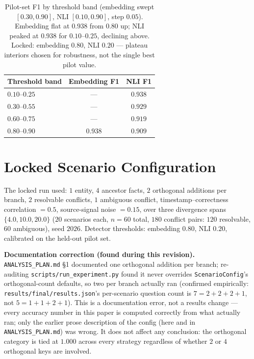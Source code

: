 \documentclass[11pt]{article}
\begin{document}
\begin{table}[t]
\centering
\small
\begin{tabular}{lcc}
\toprule
\textbf{Threshold band} & \textbf{Embedding F1} & \textbf{NLI F1} \\
\midrule
$0.10$--$0.25$ & --- & $0.938$ \\
$0.30$--$0.55$ & --- & $0.929$ \\
$0.60$--$0.75$ & --- & $0.919$ \\
$0.80$--$0.90$ & $0.938$ & $0.909$ \\
\bottomrule
\end{tabular}
\caption{Pilot-set F1 by threshold band (embedding swept $[0.30,0.90]$, NLI
$[0.10,0.90]$, step $0.05$). Embedding flat at $0.938$ from $0.80$ up; NLI
peaked at $0.938$ for $0.10$--$0.25$, declining above. Locked: embedding
$0.80$, NLI $0.20$ --- plateau interiors chosen for robustness, not the
single best pilot value.}
\label{tab:calibration}
\end{table}

\section{Locked Scenario Configuration}
\label{sec:config}

The locked run used: $1$ entity, $4$ ancestor facts, $2$ orthogonal additions per
branch, $2$ resolvable conflicts, $1$ ambiguous conflict, timestamp--correctness
correlation ${=}0.5$, source-signal noise ${=}0.15$, over three divergence spans
$\{4.0, 10.0, 20.0\}$ ($20$ scenarios each, $n{=}60$ total, $180$ conflict pairs:
$120$ resolvable, $60$ ambiguous), seed $2026$. Detector thresholds: embedding
$0.80$, NLI $0.20$, calibrated on the held-out pilot set.

\textbf{Documentation correction (found during this revision).}
\texttt{ANALYSIS\_PLAN.md} \S1 documented one orthogonal addition per branch;
re-auditing \texttt{scripts/run\_experiment.py} found it never overrides
\texttt{ScenarioConfig}'s orthogonal-count defaults, so two per branch
actually ran (confirmed empirically: \texttt{results/final/results.json}'s
per-scenario question count is $7{=}2{+}2{+}2{+}1$, not $5{=}1{+}1{+}2{+}1$).
This is a documentation error, not a results change --- every accuracy number
in this paper is computed correctly from what actually ran; only the earlier
prose description of the config (here and in \texttt{ANALYSIS\_PLAN.md}) was
wrong. It does not affect any conclusion: the orthogonal category is tied at
$1.000$ across every strategy regardless of whether $2$ or $4$ orthogonal
keys are involved.
\end{document}
